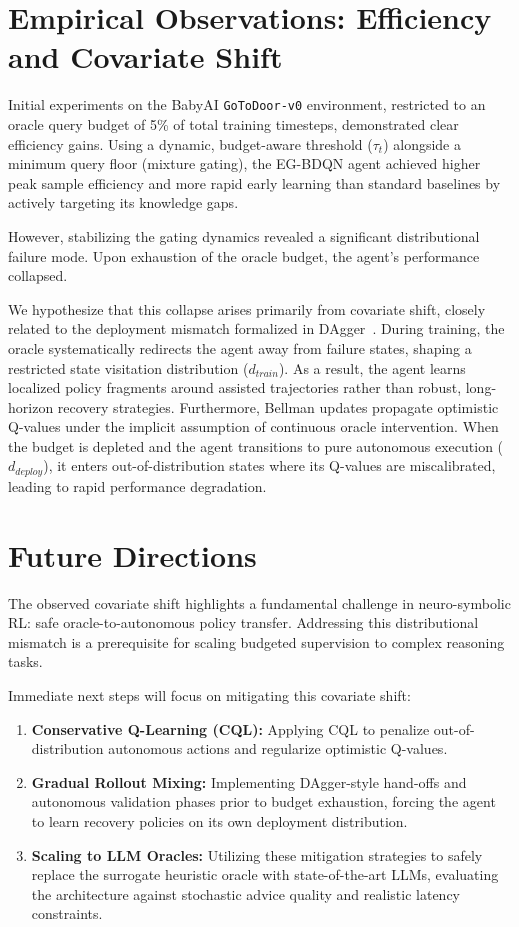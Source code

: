 \documentclass[11pt, a4paper]{article}
\begin{document}
\section*{Empirical Observations: Efficiency and Covariate Shift}
Initial experiments on the BabyAI \texttt{GoToDoor-v0} environment, restricted to an oracle query budget of 5\% of total training timesteps, demonstrated clear efficiency gains. Using a dynamic, budget-aware threshold ($\tau_t$) alongside a minimum query floor (mixture gating), the EG-BDQN agent achieved higher peak sample efficiency and more rapid early learning than standard baselines by actively targeting its knowledge gaps.

However, stabilizing the gating dynamics revealed a significant distributional failure mode. Upon exhaustion of the oracle budget, the agent's performance collapsed.

We hypothesize that this collapse arises primarily from covariate shift, closely related to the deployment mismatch formalized in DAgger~\citep{ross2011reduction}. During training, the oracle systematically redirects the agent away from failure states, shaping a restricted state visitation distribution ($d_{train}$). As a result, the agent learns localized policy fragments around assisted trajectories rather than robust, long-horizon recovery strategies. Furthermore, Bellman updates propagate optimistic Q-values under the implicit assumption of continuous oracle intervention. When the budget is depleted and the agent transitions to pure autonomous execution ($d_{deploy}$), it enters out-of-distribution states where its Q-values are miscalibrated, leading to rapid performance degradation.

\section*{Future Directions}
The observed covariate shift highlights a fundamental challenge in neuro-symbolic RL: safe oracle-to-autonomous policy transfer. Addressing this distributional mismatch is a prerequisite for scaling budgeted supervision to complex reasoning tasks. 

Immediate next steps will focus on mitigating this covariate shift:
\begin{enumerate}
    \item \textbf{Conservative Q-Learning (CQL):} Applying CQL to penalize out-of-distribution autonomous actions and regularize optimistic Q-values.
    \item \textbf{Gradual Rollout Mixing:} Implementing DAgger-style hand-offs and autonomous validation phases prior to budget exhaustion, forcing the agent to learn recovery policies on its own deployment distribution.
    \item \textbf{Scaling to LLM Oracles:} Utilizing these mitigation strategies to safely replace the surrogate heuristic oracle with state-of-the-art LLMs, evaluating the architecture against stochastic advice quality and realistic latency constraints.
\end{enumerate}
\end{document}
